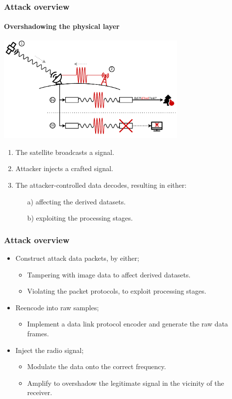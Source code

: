 \documentclass{beamer}
\begin{document}
\begin{frame}
  \frametitle{Attack overview}
  \framesubtitle{Overshadowing the physical layer}
  \centering
  \includegraphics[width=0.7\textwidth]{images/attack_illustration.pdf}
  \begin{enumerate}
    \item The satellite broadcasts a signal.
    \item Attacker injects a crafted signal.
    \item The attacker-controlled data decodes, resulting in either:
      \begin{enumerate}
        \item[a)] affecting the derived datasets.
        \item[b)] exploiting the processing stages.
      \end{enumerate}
  \end{enumerate}
\end{frame}

\begin{frame}
  \frametitle{Attack overview}
  \begin{itemize}
    \item Construct attack data packets, by either;
      \begin{itemize}
        \item Tampering with image data to affect derived datasets.
        \item Violating the packet protocols, to exploit processing stages.
      \end{itemize}
    \item Reencode into raw samples;
      \begin{itemize}
        \item Implement a data link protocol encoder and generate the raw data frames.
      \end{itemize}
    \item Inject the radio signal;
      \begin{itemize}
        \item Modulate the data onto the correct frequency.
        \item Amplify to overshadow the legitimate signal in the vicinity of the receiver.
      \end{itemize}
  \end{itemize}
\end{frame}
\end{document}
